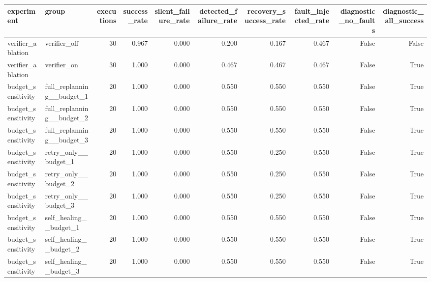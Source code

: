 \begin{tabular}{llrrrrrrrr}
\toprule
experiment & group & executions & success_rate & silent_failure_rate & detected_failure_rate & recovery_success_rate & fault_injected_rate & diagnostic_no_faults & diagnostic_all_success \\
\midrule
verifier_ablation & verifier_off & 30 & 0.967 & 0.000 & 0.200 & 0.167 & 0.467 & False & False \\
verifier_ablation & verifier_on & 30 & 1.000 & 0.000 & 0.467 & 0.467 & 0.467 & False & True \\
budget_sensitivity & full_replanning__budget_1 & 20 & 1.000 & 0.000 & 0.550 & 0.550 & 0.550 & False & True \\
budget_sensitivity & full_replanning__budget_2 & 20 & 1.000 & 0.000 & 0.550 & 0.550 & 0.550 & False & True \\
budget_sensitivity & full_replanning__budget_3 & 20 & 1.000 & 0.000 & 0.550 & 0.550 & 0.550 & False & True \\
budget_sensitivity & retry_only__budget_1 & 20 & 1.000 & 0.000 & 0.550 & 0.250 & 0.550 & False & True \\
budget_sensitivity & retry_only__budget_2 & 20 & 1.000 & 0.000 & 0.550 & 0.250 & 0.550 & False & True \\
budget_sensitivity & retry_only__budget_3 & 20 & 1.000 & 0.000 & 0.550 & 0.250 & 0.550 & False & True \\
budget_sensitivity & self_healing__budget_1 & 20 & 1.000 & 0.000 & 0.550 & 0.550 & 0.550 & False & True \\
budget_sensitivity & self_healing__budget_2 & 20 & 1.000 & 0.000 & 0.550 & 0.550 & 0.550 & False & True \\
budget_sensitivity & self_healing__budget_3 & 20 & 1.000 & 0.000 & 0.550 & 0.550 & 0.550 & False & True \\
\bottomrule
\end{tabular}
